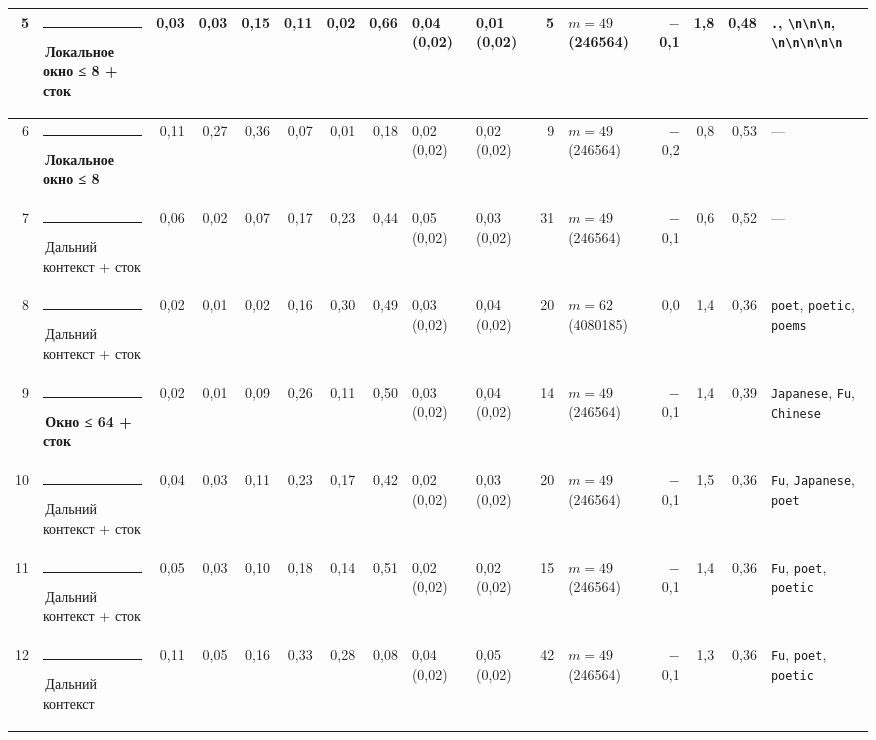 \documentclass[10pt]{article}
\begin{document}
\begin{minipage}{\linewidth}
\begin{center}
{\begin{tabular}{|r|l|r|r|r|r|r|r|l|l|r|l|r|r|r|l|}
5 & \textcolor[HTML]{1BAF7A}{\rule{0.62em}{0.62em}}\,\textbf{Локальное окно ≤ 8 + сток} & 0,03 & 0,03 & 0,15 & 0,11 & 0,02 & 0,66 & 0,04 (0,02) & 0,01 (0,02) & 5 & $m{=}49$ (246564) & $-$0,1 & 1,8 & 0,48 & \texttt{\textvisiblespace{}.}, \texttt{\textvisiblespace{}\textbackslash{}n\textbackslash{}n\textbackslash{}n}, \texttt{\textvisiblespace{}\textbackslash{}n\textbackslash{}n\textbackslash{}n\textbackslash{}n\textbackslash{}n} \\ \hline
6 & \textcolor[HTML]{1BAF7A}{\rule{0.62em}{0.62em}}\,\textbf{Локальное окно ≤ 8} & 0,11 & 0,27 & 0,36 & 0,07 & 0,01 & 0,18 & 0,02 (0,02) & 0,02 (0,02) & 9 & $m{=}49$ (246564) & $-$0,2 & 0,8 & 0,53 & — \\ \hline
7 & \textcolor[HTML]{C3C2B7}{\rule{0.62em}{0.62em}}\,Дальний контекст + сток & 0,06 & 0,02 & 0,07 & 0,17 & 0,23 & 0,44 & 0,05 (0,02) & 0,03 (0,02) & 31 & $m{=}49$ (246564) & $-$0,1 & 0,6 & 0,52 & — \\ \hline
8 & \textcolor[HTML]{C3C2B7}{\rule{0.62em}{0.62em}}\,Дальний контекст + сток & 0,02 & 0,01 & 0,02 & 0,16 & 0,30 & 0,49 & 0,03 (0,02) & 0,04 (0,02) & 20 & $m{=}62$ (4080185) & 0,0 & 1,4 & 0,36 & \texttt{\textvisiblespace{}poet}, \texttt{\textvisiblespace{}poetic}, \texttt{\textvisiblespace{}poems} \\ \hline
9 & \textcolor[HTML]{EDA100}{\rule{0.62em}{0.62em}}\,\textbf{Окно ≤ 64 + сток} & 0,02 & 0,01 & 0,09 & 0,26 & 0,11 & 0,50 & 0,03 (0,02) & 0,04 (0,02) & 14 & $m{=}49$ (246564) & $-$0,1 & 1,4 & 0,39 & \texttt{\textvisiblespace{}Japanese}, \texttt{\textvisiblespace{}Fu}, \texttt{\textvisiblespace{}Chinese} \\ \hline
10 & \textcolor[HTML]{C3C2B7}{\rule{0.62em}{0.62em}}\,Дальний контекст + сток & 0,04 & 0,03 & 0,11 & 0,23 & 0,17 & 0,42 & 0,02 (0,02) & 0,03 (0,02) & 20 & $m{=}49$ (246564) & $-$0,1 & 1,5 & 0,36 & \texttt{\textvisiblespace{}Fu}, \texttt{\textvisiblespace{}Japanese}, \texttt{\textvisiblespace{}poet} \\ \hline
11 & \textcolor[HTML]{C3C2B7}{\rule{0.62em}{0.62em}}\,Дальний контекст + сток & 0,05 & 0,03 & 0,10 & 0,18 & 0,14 & 0,51 & 0,02 (0,02) & 0,02 (0,02) & 15 & $m{=}49$ (246564) & $-$0,1 & 1,4 & 0,36 & \texttt{\textvisiblespace{}Fu}, \texttt{\textvisiblespace{}poet}, \texttt{\textvisiblespace{}poetic} \\ \hline
12 & \textcolor[HTML]{C3C2B7}{\rule{0.62em}{0.62em}}\,Дальний контекст & 0,11 & 0,05 & 0,16 & 0,33 & 0,28 & 0,08 & 0,04 (0,02) & 0,05 (0,02) & 42 & $m{=}49$ (246564) & $-$0,1 & 1,3 & 0,36 & \texttt{\textvisiblespace{}Fu}, \texttt{\textvisiblespace{}poet}, \texttt{\textvisiblespace{}poetic} \\ \hline

\end{tabular}}
\end{center}
\end{minipage}
\end{document}
